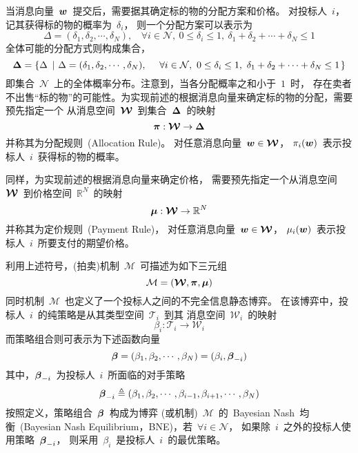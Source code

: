 \documentclass[a4paper,12pt]{article}
\newcommand{\mv}[1]{\mbox{\boldmath$#1$}}         %
\begin{document}
当消息向量~$\mv{w}$~提交后，需要据其确定标的物的分配方案和价格。
对投标人~$i$，记其获得标的物的概率为~$\delta_i$，
则一个分配方案可以表示为
\begin{equation*}
    \Delta = (\delta_1,\delta_2,\cdots,\delta_N),
              ~~~~\forall i\in\mathcal{N},~0 \le \delta_i \le 1,
              ~\delta_1 + \delta_2 + \cdots + \delta_N \le 1
\end{equation*}
全体可能的分配方式则构成集合，
\begin{equation*}
    \mv{\Delta} = \left\{\Delta\ \left| \ \Delta = (\delta_1,\delta_2,\cdots,\delta_N),
                  ~~~~\forall i\in\mathcal{N},~0 \le \delta_i \le 1,
                  ~\delta_1 + \delta_2 + \cdots + \delta_N \le 1 \right.\right\}
\end{equation*}
即集合~$\mathcal{N}$~上的全体概率分布。注意到，当各分配概率之和小于~$1$~时，
存在卖者不出售``标的物''的可能性。为实现前述的根据消息向量来确定标的物的分配，需要预先指定一个
从消息空间~$\mv{\mathcal{W}}$~到集合~$\mv{\Delta}$~的映射
\begin{equation}\label{mech:map:allocation}
    \mv{\pi}:\mv{\mathcal{W}}\rightarrow\mv{\Delta}
\end{equation}
并称其为分配规则~(Allocation Rule)。
对任意消息向量~$\mv{w}\in\mv{\mathcal{W}}$，
$\pi_i(\mv{w})$~表示投标人~$i$~获得标的物的概率。

同样，为实现前述的根据消息向量来确定价格，
需要预先指定一个从消息空间~$\mv{\mathcal{W}}$~到价格空间~$\mathbb{R}^N$~的映射
\begin{equation}\label{mech:map:payment}
    \mv{\mu}:\mv{\mathcal{W}}\rightarrow\mathbb{R}^N
\end{equation}
并称其为定价规则~(Payment Rule)，
对任意消息向量~$\mv{w}\in\mv{\mathcal{W}}$，
$\mu_i(\mv{w})$~表示投标人~$i$~所要支付的期望价格。

利用上述符号，(拍卖)机制~$\mathcal{M}$~可描述为如下三元组
\begin{equation}\label{mech:definition:mechanism}
    \mathcal{M} = \left(\mv{\mathcal{W}},\mv{\pi},\mv{\mu}\right)
\end{equation}
同时机制~$\mathcal{M}$~也定义了一个投标人之间的不完全信息静态博弈。
在该博弈中，投标人~$i$~的纯策略是从其类型空间~$\mathcal{T}_i$~到其
消息空间~$\mathcal{W}_i$~的映射
\begin{equation}\label{mech:map:pure_strategy}
    \beta_i:\mathcal{T}_i\rightarrow\mathcal{W}_i
\end{equation}
而策略组合则可表示为下述函数向量
\begin{equation*}
    \mv{\beta}=(\beta_1,\beta_2,\cdots,\beta_N)=(\beta_i,\mv{\beta}_{-i})
\end{equation*}
其中，$\mv{\beta}_{-i}$~为投标人~$i$~所面临的对手策略
\begin{equation*}
    \mv{\beta}_{-i} \triangleq (\beta_1,\beta_2,\cdots,
                                  \beta_{i-1},\beta_{i+1},\cdots,\beta_N)
\end{equation*}
按照定义，策略组合~$\mv{\beta}$~构成为博弈
(或机制)~$\mathcal{M}$~的~Bayesian Nash~均衡~(Bayesian Nash
Equilibrium，BNE)，若~$\forall i\in\mathcal{N}$，
如果除~$i$~之外的投标人使用策略~$\mv{\beta}_{-i}$，
则采用~$\beta_i$~是投标人~$i$~的最优策略。
\end{document}
